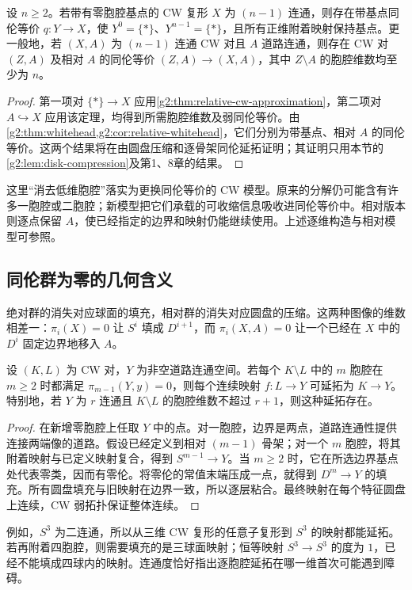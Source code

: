 \begin{corollary}\label{g2:cor:sparse-cw-model}
	设 \(n\ge2\)。若带有零胞腔基点的 CW 复形 \(X\) 为 \((n-1)\) 连通，则存在带基点同伦等价 \(q:Y\rightarrow X\)，使 \(Y^0=\{*\}\)、\(Y^{n-1}=\{*\}\)，且所有正维附着映射保持基点。更一般地，若 \((X,A)\) 为 \((n-1)\) 连通 CW 对且 \(A\) 道路连通，则存在 CW 对 \((Z,A)\) 及相对 \(A\) 的同伦等价 \((Z,A)\rightarrow(X,A)\)，其中 \(Z\setminus A\) 的胞腔维数均至少为 \(n\)。
\end{corollary}
\begin{proof}
	第一项对 \(\{*\}\rightarrow X\) 应用\cref{g2:thm:relative-cw-approximation}，第二项对 \(A\hookrightarrow X\) 应用该定理，均得到所需胞腔维数及弱同伦等价。由\cref{g2:thm:whitehead,g2:cor:relative-whitehead}，它们分别为带基点、相对 \(A\) 的同伦等价。这两个结果将在由圆盘压缩和逐骨架同伦延拓证明；其证明只用本节的\cref{g2:lem:disk-compression}及第1、8章的结果。
\end{proof}

这里“消去低维胞腔”落实为更换同伦等价的 CW 模型。原来的分解仍可能含有许多一胞腔或二胞腔；新模型把它们承载的可收缩信息吸收进同伦等价中。相对版本则逐点保留 \(A\)，使已经指定的边界和映射仍能继续使用。上述逐维构造与相对模型可参照\cite[第4.1节，CW Approximation]{Hatcher2002}。

\subsection{同伦群为零的几何含义}
\label{g2:subsec:0901:03}

绝对群的消失对应球面的填充，相对群的消失对应圆盘的压缩。这两种图像的维数相差一：\(\pi_i(X)=0\) 让 \(S^i\) 填成 \(D^{i+1}\)，而 \(\pi_i(X,A)=0\) 让一个已经在 \(X\) 中的 \(D^i\) 固定边界地移入 \(A\)。

\begin{proposition}\label{g2:prop:connectivity-extension}
	设 \((K,L)\) 为 CW 对，\(Y\) 为非空道路连通空间。若每个 \(K\setminus L\) 中的 \(m\) 胞腔在 \(m\ge2\) 时都满足 \(\pi_{m-1}(Y,y)=0\)，则每个连续映射 \(f:L\rightarrow Y\) 可延拓为 \(K\rightarrow Y\)。特别地，若 \(Y\) 为 \(r\) 连通且 \(K\setminus L\) 的胞腔维数不超过 \(r+1\)，则这种延拓存在。
\end{proposition}
\begin{proof}
	在新增零胞腔上任取 \(Y\) 中的点。对一胞腔，边界是两点，道路连通性提供连接两端像的道路。假设已经定义到相对 \((m-1)\) 骨架；对一个 \(m\) 胞腔，将其附着映射与已定义映射复合，得到 \(S^{m-1}\rightarrow Y\)。当 \(m\ge2\) 时，它在所选边界基点处代表零类，因而有零伦。将零伦的常值末端压成一点，就得到 \(D^m\rightarrow Y\) 的填充。所有圆盘填充与旧映射在边界一致，所以逐层粘合。最终映射在每个特征圆盘上连续，CW 弱拓扑保证整体连续。
\end{proof}

例如，\(S^3\) 为二连通，所以从三维 CW 复形的任意子复形到 \(S^3\) 的映射都能延拓。若再附着四胞腔，则需要填充的是三球面映射；恒等映射 \(S^3\rightarrow S^3\) 的度为 \(1\)，已经不能填成四球内的映射。连通度恰好指出逐胞腔延拓在哪一维首次可能遇到障碍。

